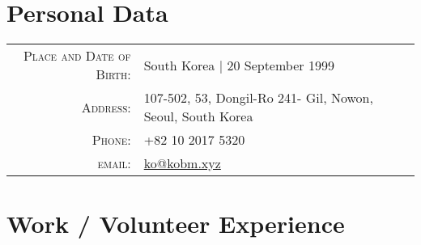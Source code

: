 \documentclass[a4paper,10pt]{article} %
\begin{document}
\pagestyle{empty} %



\par{\bigskip\par} %

\section{Personal Data}

\begin{tabular}{rl}
\textsc{Place and Date of Birth:} & South Korea  | 20 September 1999 \\
\textsc{Address:} & 107-502, 53, Dongil-Ro 241- Gil, Nowon, Seoul, South Korea \\
\textsc{Phone:} & +82 10 2017 5320\\
\textsc{email:} & \href{mailto:ko@kobm.xyz}{ko@kobm.xyz}\\
\end{tabular}


\section{Work / Volunteer Experience}
\end{document}
